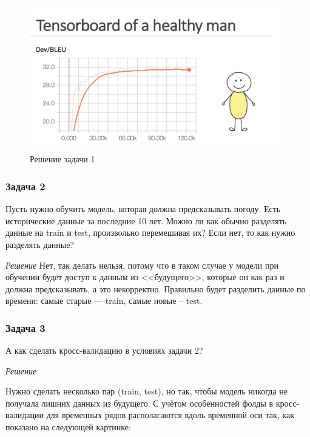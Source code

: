 \begin{figure}[h]
    \centering
    \includegraphics[width=\textwidth/2]{chapters/general/sol-1.png}
    \caption{Решение задачи 1}
    \label{img:sol-1}
\end{figure}

\subsubsection{Задача 2}

Пусть нужно обучить модель, которая должна предсказывать погоду. Есть исторические данные за последние 10 лет. Можно ли как обычно разделять данные на train и test, произвольно перемешивая их? Если нет, то как нужно разделять данные?

\textit{Решение}
Нет, так делать нельзя, потому что в таком случае у модели при обучении будет доступ к данным из <<будущего>>, которые он как раз и должна предсказывать, а это некорректно. Правильно будет разделить данные по времени: самые старые --- train, самые новые -- test.

\subsubsection{Задача 3}

А как сделать кросс-валидацию в условиях задачи 2?

\textit{Решение}

Нужно сделать несколько пар (train, test), но так, чтобы модель никогда не получала лишних данных из будущего. С учётом особенностей фолды в кросс-валидации для временных рядов располагаются вдоль временной оси так, как показано на следующей картинке:


